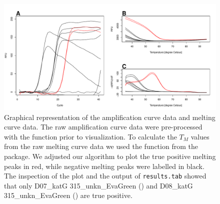 \begin{figure}[htbp]
  \centering
  \includegraphics[clip=true, width=14.5cm]{figures/amp_melt.pdf} 
\caption{Graphical representation of the amplification curve data and melting 
curve data.  The raw amplification curve data were pre-processed 
with the  function prior to visualization. To calculate the $T_{M}$ 
values from the raw melting curve data  we used the  
function from the  package.  We adjusted our 
algorithm to plot the true positive melting peaks in red, while negative melting 
peaks were labelled in black. The inspection of the plot and the output of 
\texttt{results.tab} showed that only D07\_katG 315\_unkn\_EvaGreen 
(\textcolor{red}\textemdash) and D08\_katG 315\_unkn\_EvaGreen 
(\textcolor{red}\textemdash) are true positive.
} 
\label{figure:amp_melt}
\end{figure}

